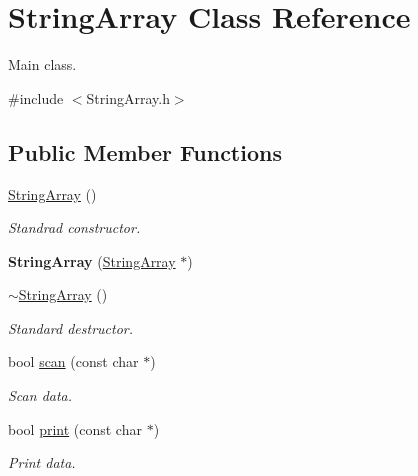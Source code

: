 \hypertarget{class_string_array}{}\section{String\+Array Class Reference}
\label{class_string_array}


Main class.  




{\ttfamily \#include $<$String\+Array.\+h$>$}

\subsection*{Public Member Functions}
\begin{DoxyCompactItemize}
\item 
\mbox{\label{class_string_array_a02f4a1dc1bc63b44c4aeafe174b3b681}} 
\mbox{\hyperlink{class_string_array_a02f4a1dc1bc63b44c4aeafe174b3b681}{String\+Array}} ()
\begin{DoxyCompactList}\small\item\em Standrad constructor. \end{DoxyCompactList}\item 
\mbox{\label{class_string_array_ae3d61d4f09029a9b803bf61fd3853929}} 
{\bfseries String\+Array} (\mbox{\hyperlink{class_string_array}{String\+Array}} $\ast$)
\item 
\mbox{\label{class_string_array_af1fc945005ae8a218d30c3281e0b64bd}} 
\mbox{\hyperlink{class_string_array_af1fc945005ae8a218d30c3281e0b64bd}{$\sim$\+String\+Array}} ()
\begin{DoxyCompactList}\small\item\em Standard destructor. \end{DoxyCompactList}\item 
bool \mbox{\hyperlink{class_string_array_af548aec5f0efc6bdcb85bbc9ff3314ae}{scan}} (const char $\ast$)
\begin{DoxyCompactList}\small\item\em Scan data. \end{DoxyCompactList}\item 
bool \mbox{\hyperlink{class_string_array_a4b24347f36da4c591463d39ddbce1660}{print}} (const char $\ast$)
\begin{DoxyCompactList}\small\item\em Print data. \end{DoxyCompactList}\item 

\end{DoxyCompactItemize}
